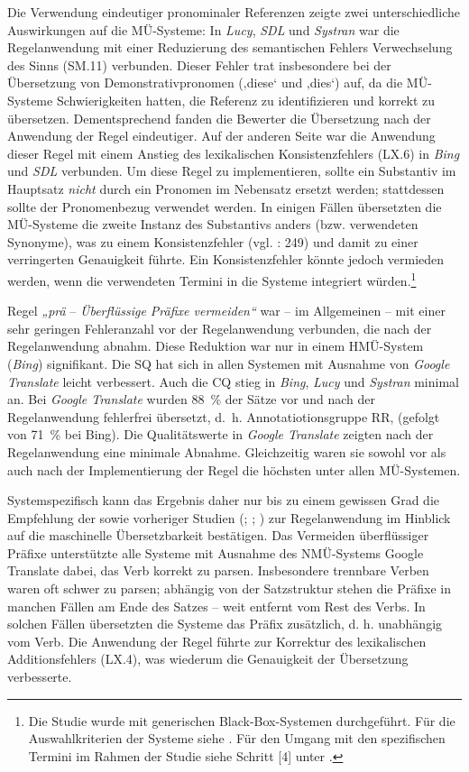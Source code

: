 Die Verwendung eindeutiger pronominaler Referenzen zeigte zwei unterschiedliche Auswirkungen auf die MÜ-Systeme: In \textit{Lucy}, \textit{SDL} und \textit{Systran} war die Regelanwendung mit einer Reduzierung des semantischen Fehlers Verwechselung des Sinns (SM.11) verbunden. Dieser Fehler trat insbesondere bei der Übersetzung von Demonstrativpronomen (‚diese‘ und ‚dies‘) auf, da die MÜ-Systeme Schwierigkeiten hatten, die Referenz zu identifizieren und korrekt zu übersetzen. Dementsprechend fanden die Bewerter die Übersetzung nach der Anwendung der Regel eindeutiger. Auf der anderen Seite war die Anwendung dieser Regel mit einem Anstieg des lexikalischen Konsistenzfehlers (LX.6) in \textit{Bing} und \textit{SDL} verbunden. Um diese Regel zu implementieren, sollte ein Substantiv im Hauptsatz \textit{nicht} durch ein Pronomen im Nebensatz ersetzt werden; stattdessen sollte der Pronomenbezug verwendet werden. In einigen Fällen übersetzten die MÜ-Systeme die zweite Instanz des Substantivs anders (bzw. verwendeten Synonyme), was zu einem Konsistenzfehler (vgl. \citealt{Mertin2006}: 249) und damit zu einer verringerten Genauigkeit führte. Ein Konsistenzfehler könnte jedoch vermieden werden, wenn die verwendeten Termini in die Systeme integriert würden.\footnote{\textrm{Die Studie wurde mit generischen Black-Box-Systemen durchgeführt. Für die Auswahlkriterien der Systeme siehe . Für den Umgang mit den spezifischen Termini im Rahmen der Studie siehe Schritt [4] unter .} }

Regel \textit{„prä} -- \textit{Überflüssige Präfixe vermeiden“} war – im Allgemeinen – mit einer sehr geringen Fehleranzahl vor der Regelanwendung verbunden, die nach der Regelanwendung abnahm. Diese Reduktion war nur in einem HMÜ-System (\textit{Bing}) signifikant. Die SQ hat sich in allen Systemen mit Ausnahme von \textit{Google Translate} leicht verbessert. Auch die CQ stieg in \textit{Bing}, \textit{Lucy} und \textit{Systran} minimal an. Bei \textit{Google Translate} wurden 88~\% der Sätze vor und nach der Regelanwendung fehlerfrei übersetzt, d.~h. Annotatiotionsgruppe RR, (gefolgt von 71~\% bei Bing). Die Qualitätswerte in \textit{Google Translate} zeigten nach der Regelanwendung eine minimale Abnahme. Gleichzeitig waren sie sowohl vor als auch nach der Implementierung der Regel die höchsten unter allen MÜ-Systemen.

Systemspezifisch kann das Ergebnis daher nur bis zu einem gewissen Grad die Empfehlung der \citet[111]{tekom2013} sowie vorheriger Studien (\citealt{BernthGdaniec2001}; \citealt{Siegel2011}; \citealt{Siegel2013}) zur Regelanwendung im Hinblick auf die maschinelle Übersetzbarkeit bestätigen. Das Vermeiden überflüssiger Präfixe unterstützte alle Systeme mit Ausnahme des NMÜ-Systems Google Translate dabei, das Verb korrekt zu parsen. Insbesondere trennbare Verben waren oft schwer zu parsen; abhängig von der Satzstruktur stehen die Präfixe in manchen Fällen am Ende des Satzes -- weit entfernt vom Rest des Verbs. In solchen Fällen übersetzten die Systeme das Präfix zusätzlich, d. h. unabhängig vom Verb. Die Anwendung der Regel führte zur Korrektur des lexikalischen Additionsfehlers (LX.4), was wiederum die Genauigkeit der Übersetzung verbesserte.

